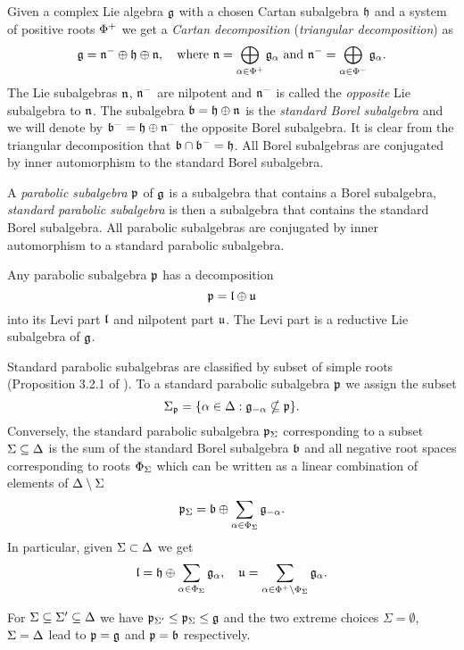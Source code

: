 Given a complex Lie algebra $\mathfrak{g}$ with a chosen Cartan subalgebra $\mathfrak{h}$ and a system of positive roots $\Phi^+$ we get a \emph{Cartan decomposition} (\emph{triangular decomposition}) as
\[
 \mathfrak{g} = \mathfrak{n}^- \oplus \mathfrak{h} \oplus \mathfrak{n}, \quad \text{where } \mathfrak{n} = \bigoplus_{\alpha \in \Phi^+} \mathfrak{g}_\alpha \text{ and } \mathfrak{n}^- = \bigoplus_{\alpha \in \Phi^-} \mathfrak{g}_\alpha.
\]
The Lie subalgebras $\mathfrak{n}$, $\mathfrak{n}^-$ are nilpotent and $\mathfrak{n}^-$ is called the \emph{opposite} Lie subalgebra to $\mathfrak{n}$. The subalgebra $\mathfrak{b} = \mathfrak{h}\oplus \mathfrak{n}$ is the \emph{standard Borel subalgebra} and we will denote by $\mathfrak{b}^- = \mathfrak{h}\oplus \mathfrak{n}^-$ the opposite  Borel subalgebra. It is clear from the triangular  decomposition that $\mathfrak{b}\cap\mathfrak{b}^- = \mathfrak{h}$. All Borel subalgebras are conjugated by inner automorphism to the standard Borel subalgebra.

A \emph{parabolic subalgebra} $\mathfrak{p}$ of $\mathfrak{g}$ is a subalgebra that contains a Borel subalgebra, \emph{standard parabolic subalgebra} is then a subalgebra that contains the standard Borel subalgebra. All parabolic subalgebras are conjugated by inner automorphism to a standard parabolic subalgebra.

Any parabolic subalgebra $\mathfrak{p}$ has a decomposition
\[
 \mathfrak{p} = \mathfrak{l} \oplus \mathfrak{u}
\]
into its Levi part $\mathfrak{l}$ and nilpotent part $\mathfrak{u}$. The Levi part is a reductive Lie subalgebra of $\mathfrak{g}$.

Standard parabolic subalgebras are classified by subset of simple roots (Proposition 3.2.1 of \cite{cap_parabolic_2009}). To a standard parabolic subalgebra $\mathfrak{p}$ we assign the subset \[\Sigma_{\mathfrak{p}} = \{ \alpha\in\Delta : \mathfrak{g}_{-\alpha}\nsubseteq \mathfrak{p} \}.\] Conversely, the standard parabolic subalgebra $\mathfrak{p}_\Sigma$ corresponding to a subset $\Sigma \subseteq \Delta$ is the sum of the standard Borel subalgebra $\mathfrak{b}$ and all negative root spaces corresponding to roots $\Phi_\Sigma$ which can be written as a linear combination of elements of $\Delta \setminus \Sigma$
\[
 \mathfrak{p}_\Sigma = \mathfrak{b} \oplus \sum_{\alpha \in \Phi_\Sigma} \mathfrak{g}_{-\alpha}.
\]
In particular, given $\Sigma \subset \Delta$ we get
\[
 \mathfrak{l} = \mathfrak{h} \oplus \sum_{\alpha \in \Phi_\Sigma} \mathfrak{g}_\alpha, \quad \mathfrak{u} = \sum_{\alpha \in \Phi^+ \setminus \Phi_\Sigma} \mathfrak{g}_{\alpha}.
\]

For $\Sigma \subseteq \Sigma' \subseteq \Delta$ we have $\mathfrak{p}_{\Sigma'} \leq \mathfrak{p}_\Sigma \leq \mathfrak{g}$ and the two extreme choices $\Sigma = \emptyset$, $\Sigma = \Delta$ lead to $\mathfrak{p}= \mathfrak{g}$ and $\mathfrak{p} = \mathfrak{b}$ respectively.

